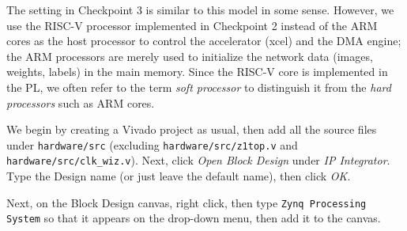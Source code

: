\documentclass[11pt]{article}
\begin{document}
\begin{appendices}
The setting in Checkpoint 3 is similar to this model in some sense. However, we use the RISC-V processor implemented in Checkpoint 2 instead of the ARM cores as the host processor to control the accelerator (xcel) and the DMA engine; the ARM processors are merely used to initialize the network data (images, weights, labels) in the main memory. Since the RISC-V core is implemented in the PL, we often refer to the term \textit{soft processor} to distinguish it from the \textit{hard processors} such as ARM cores.

We begin by creating a Vivado project as usual, then add all the source files under \verb|hardware/src| (excluding \verb|hardware/src/z1top.v| and \verb|hardware/src/clk_wiz.v|).
Next, click \emph{Open Block Design} under \emph{IP Integrator}. Type the Design name (or just leave the default name), then click \emph{OK}.

\begin{center}
\end{center}

Next, on the Block Design canvas, right click, then type \texttt{Zynq Processing System} so that it appears on the drop-down menu, then add it to the canvas.

\begin{center}
\end{center}


\end{appendices}
\end{document}
